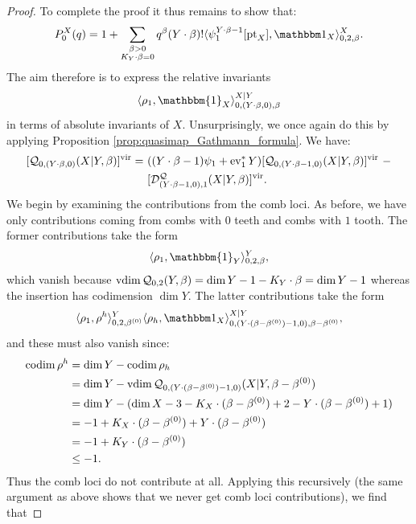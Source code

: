 \begin{proof}
To complete the proof it thus remains to show that:
\begin{equation*} P_0^X(q) = 1 + \sum_{\substack{\beta>0 \\ K_Y\cdot\beta=0}} q^\beta(Y\cdot\beta)!\langle\psi_1^{Y\cdot\beta-1} [\pt_X],\mathbbm 1_{X}\rangle_{0,2,\beta}^X. \end{equation*}
The aim therefore is to express the relative invariants
\begin{equation*} \langle \rho_1 , \mathbbm{1}_X \rangle_{0,(Y\cdot\beta,0),\beta}^{X|Y} \end{equation*}
in terms of absolute invariants of $X$. Unsurprisingly, we once again do this by applying Proposition \ref{prop:quasimap_Gathmann_formula}. We have:
\begin{align*} [\mathcal{Q}_{0,(Y \cdot \beta,0)}(X|Y,\beta)]^{\mathrm{vir}} = \ & ((Y\cdot\beta-1)\psi_1+\operatorname{ev}_1^*Y) [\mathcal{Q}_{0,(Y\cdot\beta-1,0)}(X|Y,\beta)]^{\mathrm{vir}} \ - \\
& [\mathcal{D}_{(Y\cdot\beta-1,0),1}^{\mathcal Q}(X|Y,\beta)]^{\mathrm{vir}}. \end{align*}
We begin by examining the contributions from the comb loci. As before, we have only contributions coming from combs with $0$ teeth and combs with $1$ tooth. The former contributions take the form
\begin{equation*} \langle \rho_1 , \mathbbm{1}_Y \rangle_{0,2,\beta}^Y, \end{equation*}
which vanish because $\operatorname{vdim}{\mathcal{Q}_{0,2}(Y,\beta)} = \dim Y -1 -K_Y\cdot\beta = \dim Y -1$ whereas the insertion has codimension $\dim Y$. The latter contributions take the form
\begin{equation*} \langle \rho_1 ,\rho^h\rangle_{0,2,\beta^{(0)}}^Y \langle \rho_h,\mathbbm 1_{X}\rangle_{0,(Y\cdot(\beta-\beta^{(0)})-1,0),\beta-\beta^{(0)}}^{X|Y},\end{equation*}
and these must also vanish since:
\begin{align*} \operatorname{codim} \rho^h & = \dim Y - \operatorname{codim} \rho_h \\
& = \dim Y - \operatorname{vdim} \mathcal{Q}_{0,(Y\cdot(\beta-\beta^{(0)})-1,0)}(X|Y,\beta-\beta^{(0)}) \\
& = \dim Y - (\dim X - 3 - K_X \cdot (\beta - \beta^{(0)}) + 2 - Y \cdot (\beta - \beta^{(0)}) + 1) \\
&= -1 + K_X \cdot (\beta-\beta^{(0)}) + Y \cdot (\beta-\beta^{(0)}) \\
& = -1 + K_Y\cdot(\beta-\beta^{(0)}) \\
& \leq -1.
\end{align*}
Thus the comb loci do not contribute at all. Applying this recursively (the same argument as above shows that we never get comb loci contributions), we find that

\end{proof}
